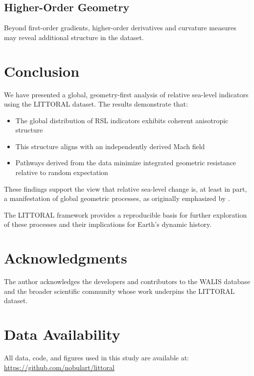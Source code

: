 \documentclass[twocolumn,10pt]{article}
\begin{document}
\subsection{Higher-Order Geometry}

Beyond first-order gradients, higher-order derivatives and curvature measures may reveal additional structure in the dataset.

\section{Conclusion}

We have presented a global, geometry-first analysis of relative sea-level indicators using the LITTORAL dataset. The results demonstrate that:

\begin{itemize}
\item The global distribution of RSL indicators exhibits coherent anisotropic structure
\item This structure aligns with an independently derived Mach field
\item Pathways derived from the data minimize integrated geometric resistance relative to random expectation
\end{itemize}

These findings support the view that relative sea-level change is, at least in part, a manifestation of global geometric processes, as originally emphasized by \citet{fairbridge1961}.

The LITTORAL framework provides a reproducible basis for further exploration of these processes and their implications for Earth's dynamic history.

\section*{Acknowledgments}

The author acknowledges the developers and contributors to the WALIS database and the broader scientific community whose work underpins the LITTORAL dataset.

\section*{Data Availability}

All data, code, and figures used in this study are available at:
\url{https://github.com/nobulart/littoral}
\end{document}
